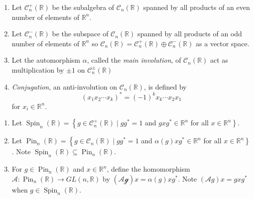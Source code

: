 \documentclass[11pt]{homework}
\begin{document}
\begin{definition}
    \begin{enumerate}
        \item Let $\mathcal{C}_{n}^{+}(\mathbb{R})$ be the subalgebra of $\mathcal{C}_{n}(\mathbb{R})$ spanned by all products of an even number of elements of $\mathbb{R}^{n}$.
        \item Let $\mathcal{C}_{n}^{-}(\mathbb{R})$ be the subspace of $\mathcal{C}_{n}(\mathbb{R})$ spanned by all products of an odd number of elements of $\mathbb{R}^{n}$ so $\mathcal{C}_{n}(\mathbb{R})=\mathcal{C}_{n}^{+}(\mathbb{R}) \oplus \mathcal{C}_{n}^{-}(\mathbb{R})$ as a vector space.
        \item Let the automorphism $\alpha$, called the \textit{main involution}, of $\mathcal{C}_{n}(\mathbb{R})$ act as multiplication by $\pm 1$ on $\mathcal{C}_{n}^{\pm}(\mathbb{R})$
        \item \textit{Conjugation}, an anti-involution on $\mathcal{C}_{n}(\mathbb{R})$, is defined by
        \begin{equation*}
            \left(x_{1} x_{2} \cdots x_{k}\right)^{*}=(-1)^{k} x_{k} \cdots x_{2} x_{1}
        \end{equation*}
        for $x_{i} \in \mathbb{R}^{n}$.
    \end{enumerate}
\end{definition}

\begin{definition}
    \begin{enumerate}
        \item Let $\operatorname{Spin}_{n}(\mathbb{R})=\left\{g \in \mathcal{C}_{n}^{+}(\mathbb{R}) \mid g g^{*}=1\right.$ and $g x g^{*} \in \mathbb{R}^{n}$ for all $\left.x \in \mathbb{R}^{n}\right\}$.
        \item Let $\operatorname{Pin}_{n}(\mathbb{R})=\left\{g \in \mathcal{C}_{n}(\mathbb{R}) \mid g g^{*}=1\right.$ and $\alpha(g) x g^{*} \in \mathbb{R}^{n}$ for all $\left.x \in \mathbb{R}^{n}\right\}$. Note $\operatorname{Spin}_{n}(\mathbb{R}) \subseteq \operatorname{Pin}_{n}(\mathbb{R})$.
        \item For $g \in \operatorname{Pin}_{n}(\mathbb{R})$ and $x \in \mathbb{R}^{n}$, define the homomorphism $\mathcal{A}: \operatorname{Pin}_{n}(\mathbb{R}) \rightarrow G L(n, \mathbb{R})$ by $(\mathcal{A g}) x=\alpha(g) x g^{*}$. Note $(\mathcal{A} g) x=g x g^{*}$ when $g \in \operatorname{Spin}_{n}(\mathbb{R})$.
    \end{enumerate}
\end{definition}
\end{document}
